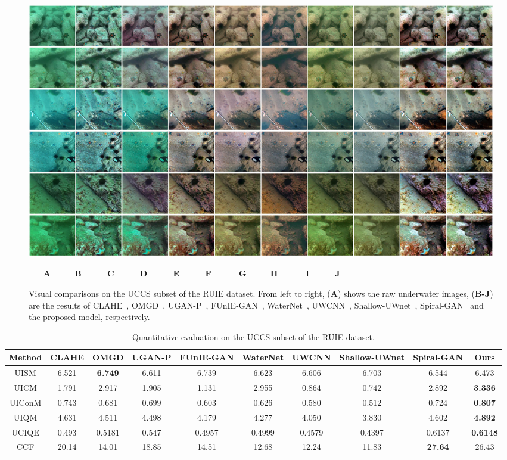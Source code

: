\documentclass[utf8]{FrontiersinHarvard} %
\begin{document}
\begin{figure}[htbp]
\begin{center}
\includegraphics[width=1\textwidth]{FSpiralGAN_frontiers/onepicture/UCCS300.jpg}
\end{center}
$~~~~~~~~$\textbf{A}$~~~~~~~~~~~~~$\textbf{B}$~~~~~~~~~~~~~~$\textbf{C}$~~~~~~~~~~~~~~$\textbf{D}$~~~~~~~~~~~~~~$\textbf{E}$~~~~~~~~~~~~~~$\textbf{F}$~~~~~~~~~~~~~~~$\textbf{G}$~~~~~~~~~~~~~$\textbf{H}$~~~~~~~~~~~~~~~$\textbf{I}$~~~~~~~~~~~~~~$\textbf{J}
 \caption{{Visual comparisons on the UCCS subset of the RUIE dataset. From left to right, (\textbf{A}) shows the raw underwater images, (\textbf{B-J}) are the results of CLAHE~\citep{109340}, OMGD~\citep{ren2021online}, UGAN-P~\citep{8460552}, FUnIE-GAN~\citep{9001231}, WaterNet~\citep{8917818}, UWCNN~\citep{2019Underwater1}, Shallow-UWnet~\citep{naik2021shallow}, Spiral-GAN~\citep{2020Underwater} and the proposed model, respectively.}\label{fig:comparison-3part}}
\end{figure}

\begin{table}[htbp]\small
\centering
\setlength\tabcolsep{3pt}
\caption{{Quantitative evaluation on the UCCS subset of the RUIE dataset.}}
\begin{tabular}{c|ccccccccc}
\hline  
Method&CLAHE&OMGD&UGAN-P&FUnIE-GAN&WaterNet&UWCNN&Shallow-UWnet&Spiral-GAN&Ours\\
\hline 
UISM&6.521&\textbf{6.749}&6.611&6.739&6.623&6.606&6.703&6.544&6.473\\
\hline 
UICM&1.791&2.917&1.905&1.131&2.955&0.864&0.742&2.892&\textbf{3.336}\\
\hline 
UIConM&0.743&0.681&0.699&0.603&0.626&0.580&0.512&0.724&\textbf{0.807}\\
\hline 
UIQM&4.631&4.511&4.498&4.179&4.277&4.050&3.830&4.602&\textbf{4.892}\\
\hline 
UCIQE&0.493&0.5181&0.547&0.4957&0.4999&0.4579&0.4397&0.6137&\textbf{0.6148}\\
\hline
CCF&20.14&14.01&18.85&14.51&12.68&12.24&11.83&\textbf{27.64}&26.43\\
\hline
\end{tabular}
\label{tbl:comparison-3part}
\end{table}
\end{document}
